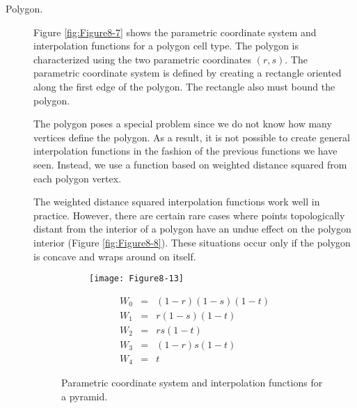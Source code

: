 \begin{description}
    \item[Polygon.] Figure \ref{fig:Figure8-7} shows the parametric coordinate system and interpolation functions for a polygon cell type. The polygon is characterized using the two parametric coordinates $(r,s)$. The parametric coordinate system is defined by creating a rectangle oriented along the first edge of the polygon. The rectangle also must bound the polygon.

    The polygon poses a special problem since we do not know how many vertices define the polygon. As a result, it is not possible to create general interpolation functions in the fashion of the previous functions we have seen. Instead, we use a function based on weighted distance squared from each polygon vertex.

    The weighted distance squared interpolation functions work well in practice. However, there are certain rare cases where points topologically distant from the interior of a polygon have an undue effect on the polygon interior (Figure \ref{fig:Figure8-8}). These situations occur only if the polygon is concave and wraps around on itself.

    \begin{figure}[!htb]
        \centering
        \begin{subfigure}{0.48\linewidth}
            \centering
            \texttt{[image: Figure8-13]}
            \caption*{}
        \end{subfigure}
        \hfill
        \begin{subfigure}{0.48\linewidth}
            \centering
            \begin{equation*}
            \begin{array}{lll}
            W_0 &=& (1-r)(1-s)(1-t) \\
            W_1 &=& r(1-s)(1-t) \\
            W_2 &=& r s (1-t) \\
            W_3 &=& (1-r)s(1-t) \\
            W_4 &=& t
            \end{array}
            \end{equation*}
        \end{subfigure}%
        \caption{Parametric coordinate system and interpolation functions for a pyramid.}
        \label{fig:Figure8-13}
    \end{figure}


\end{description}
